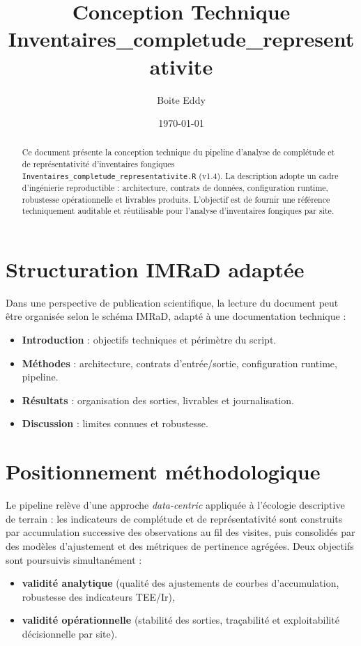 \documentclass[11pt,a4paper]{article}
\title{Conception Technique\\
\large Inventaires\_completude\_representativite}
\author{Boite Eddy}
\date{\today}
\begin{document}
\sloppy
\maketitle

\begin{abstract}
Ce document présente la conception technique du pipeline d'analyse de complétude et de
représentativité d'inventaires fongiques \texttt{Inventaires\_completude\_representativite.R}
(v1.4). La description adopte un cadre d'ingénierie reproductible : architecture, contrats de
données, configuration runtime, robustesse opérationnelle et livrables produits. L'objectif est
de fournir une référence techniquement auditable et réutilisable pour l'analyse d'inventaires
fongiques par site.
\end{abstract}
\tableofcontents
\newpage

\section{Structuration IMRaD adaptée}
Dans une perspective de publication scientifique, la lecture du document peut
être organisée selon le schéma IMRaD, adapté à une documentation technique :
\begin{itemize}[leftmargin=1.2cm]
  \item \textbf{Introduction} : objectifs techniques et périmètre du script.
  \item \textbf{Méthodes} : architecture, contrats d'entrée/sortie, configuration runtime, pipeline.
  \item \textbf{Résultats} : organisation des sorties, livrables et journalisation.
  \item \textbf{Discussion} : limites connues et robustesse.
\end{itemize}

\section{Positionnement méthodologique}
Le pipeline relève d'une approche \textit{data-centric} appliquée à l'écologie descriptive de
terrain : les indicateurs de complétude et de représentativité sont construits par accumulation
successive des observations au fil des visites, puis consolidés par des modèles d'ajustement et
des métriques de pertinence agrégées. Deux objectifs sont poursuivis simultanément :
\begin{itemize}[leftmargin=1.2cm]
  \item \textbf{validité analytique} (qualité des ajustements de courbes d'accumulation, robustesse des indicateurs TEE/Ir),
  \item \textbf{validité opérationnelle} (stabilité des sorties, traçabilité et exploitabilité décisionnelle par site).
\end{itemize}
\end{document}
